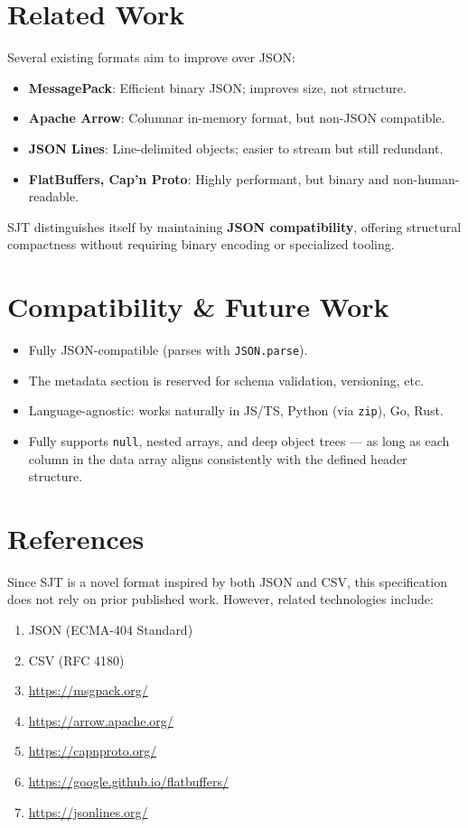 \documentclass[12pt]{article}
\begin{document}
\section{Related Work}
Several existing formats aim to improve over JSON:

\begin{itemize}
  \item \textbf{MessagePack}: Efficient binary JSON; improves size, not structure.
  \item \textbf{Apache Arrow}: Columnar in-memory format, but non-JSON compatible.
  \item \textbf{JSON Lines}: Line-delimited objects; easier to stream but still redundant.
  \item \textbf{FlatBuffers, Cap’n Proto}: Highly performant, but binary and non-human-readable.
\end{itemize}

SJT distinguishes itself by maintaining \textbf{JSON compatibility}, offering structural compactness without requiring binary encoding or specialized tooling.

\section{Compatibility \& Future Work}
\begin{itemize}
  \item Fully JSON-compatible (parses with \texttt{JSON.parse}).
  \item The metadata section is reserved for schema validation, versioning, etc.
  \item Language-agnostic: works naturally in JS/TS, Python (via \texttt{zip}), Go, Rust.
  \item Fully supports \texttt{null}, nested arrays, and deep object trees --- as long as each column in the data array aligns consistently with the defined header structure.
\end{itemize}
\section{References}
Since SJT is a novel format inspired by both JSON and CSV, this specification does not rely on prior published work. However, related technologies include:

\begin{enumerate}
  \item JSON (ECMA-404 Standard)
  \item CSV (RFC 4180)
  \item \url{https://msgpack.org/}
  \item \url{https://arrow.apache.org/}
  \item \url{https://capnproto.org/}
  \item \url{https://google.github.io/flatbuffers/}
  \item \url{https://jsonlines.org/}
\end{enumerate}
\end{document}
